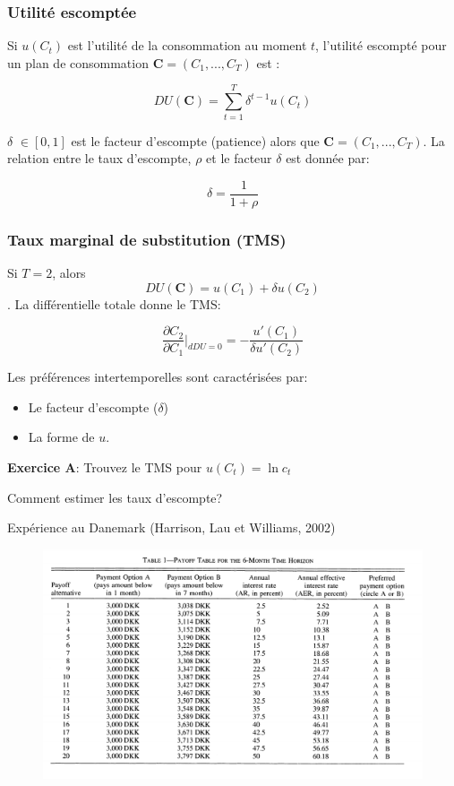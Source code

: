 \documentclass[handout]{beamer}
\begin{document}
\begin{frame}\frametitle{Utilité escomptée}

Si $u(C_t)$ est l'utilité de la consommation au moment $t$, l'utilité escompté pour un plan de consommation $\textbf{C} = (C_1,...,C_T)$ est :


$$ DU(\mathbf{C}) = \sum_{t=1}^T \delta^{t-1} u(C_t) $$

$\delta$ $\in [0,1]$ est le facteur d'escompte (patience) alors que $\mathbf{C} = (C_1,...,C_T)$. La relation entre le taux d'escompte, $\rho$ et le facteur $\delta$ est donnée par: 

$$ \delta = \frac{1}{1+\rho} $$

\end{frame}

\begin{frame}\frametitle{Taux marginal de substitution (TMS)}

Si $T=2$, alors $$ DU(\textbf{C}) = u(C_1) +  \delta u(C_2) $$. La différentielle totale donne le TMS: 

$$ \frac{\partial C_2}{\partial C_1}\rvert_{dDU=0} = -\frac{u'(C_1)}{\delta u'(C_2)}$$

Les préférences intertemporelles sont caractérisées par: 

\begin{itemize}
\item Le facteur d'escompte ($\delta$)
\item La forme de $u$. 
\end{itemize}

\textbf{Exercice A}: Trouvez le TMS pour $u(C_t) = \ln c_t$

\end{frame}


\begin{frame}{Comment estimer les taux d'escompte?}

Expérience au Danemark  (Harrison, Lau et Williams, 2002)

\begin{figure}
\includegraphics[scale=0.5]{MPL.png}
\end{figure}


\end{frame}
\end{document}
